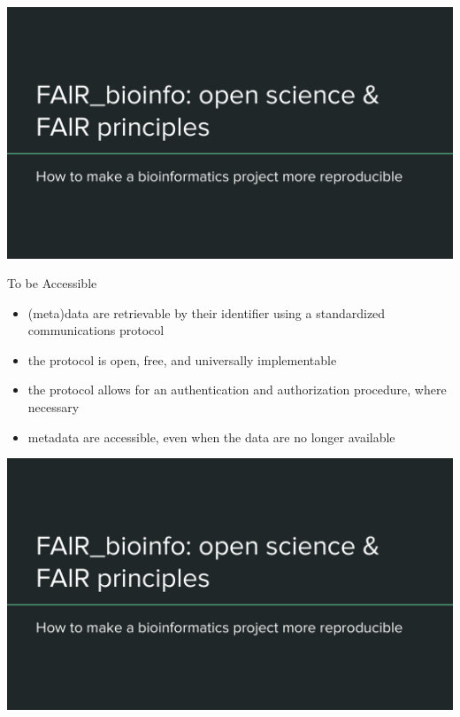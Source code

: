 \begin{frame}
\includegraphics[page=9,scale=0.55]{01_OS_and_FAIR_intro.pdf}
\end{frame}

\begin{frame}
\begin{block}{To be Accessible}
\begin{itemize}
\item (meta)data are retrievable by their identifier using a standardized communications protocol
\item the protocol is open, free, and universally implementable
\item the protocol allows for an authentication and authorization procedure, where necessary
\item metadata are accessible, even when the data are no longer available
\end{itemize}
\end{block}
\end{frame}

\begin{frame}
\includegraphics[page=10,scale=0.55]{01_OS_and_FAIR_intro.pdf}
\end{frame}

